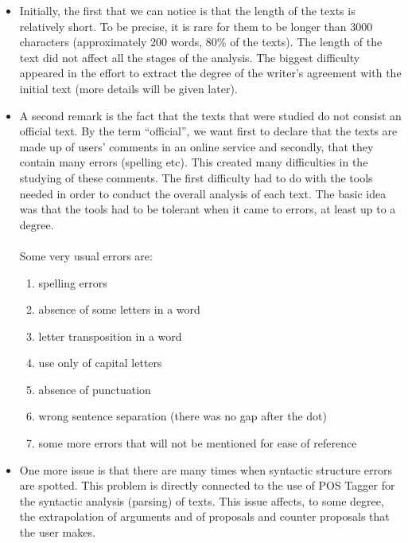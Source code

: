 \begin{itemize}
  \item Initially, the first that we can notice is that the length of the texts is 	relatively short. To be precise, it is rare for them to be longer than 3000 characters (approximately 200 words, 80\% of the texts). The length of the text did not affect all the stages of the analysis. The biggest difficulty appeared in the effort to extract the degree of the writer's agreement with the initial text (more details will be given later).\\
  
  \item A second remark is the fact that the texts that were studied do not consist an official text. By the term ``official'', we want first to declare that the texts are made up of users' comments in an online service and secondly, that they contain many errors (spelling etc). This created many difficulties in the studying of these comments. The first difficulty had to do with the tools needed in order to conduct the overall analysis of each text. The basic idea was that the tools had to be tolerant when it came to errors, at least up to a degree.\\
\\
Some very usual errors are:

  	\begin{enumerate}
  	\item spelling errors
  	\item absence of some letters in a word
  	\item letter transposition in a word
  	\item use only of capital letters
  	\item absence of punctuation
  	\item wrong sentence separation (there was no gap after the dot)
  	\item some more errors that will not be mentioned for ease of reference\\
	\end{enumerate}

  \item One more issue is  that there are many times when syntactic structure errors are 	spotted. This problem is directly connected to the use of POS Tagger for the syntactic analysis (parsing) of texts. This issue affects, to some degree, the extrapolation of arguments and of proposals and counter proposals that the user makes.\\
  

\end{itemize}
